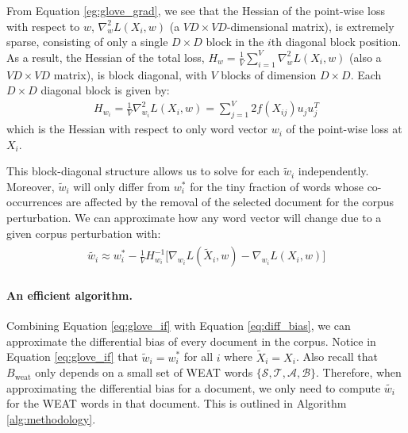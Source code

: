 \documentclass{article}
\newcommand{\xhdr}[1]{\paragraph*{\bf {#1.}}}
\begin{document}
From Equation \eqref{eg:glove_grad}, we see that the Hessian of the point-wise loss with respect to $w$, $\nabla_w^2 L(X_i, w)$ (a $VD \times VD$-dimensional matrix), is extremely sparse, consisting of only a single $D \times D$ block in the $i$th diagonal block position. As a result, the Hessian of the total loss, $H_w = \frac{1}{V}\sum_{i=1}^{V}\nabla_{w}^2 L(X_i, w)$ (also a $VD \times VD$ matrix), is block diagonal, with $V$ blocks of dimension $D \times D$. Each $D \times D$ diagonal block is given by:
\begin{align*}
H_{w_i} = \frac{1}{V} \nabla_{w_i}^2 L(X_i, w) = \sum_{j=1}^{V}2f(X_{ij})u_ju_j^T
\end{align*}
which is the Hessian with respect to only word vector $w_i$ of the point-wise loss at $X_i$.

This block-diagonal structure allows us to solve for each $\tilde{w}_i$ independently. Moreover, $\tilde{w}_i$ will only differ from $w^*_i$ for the tiny fraction of words whose co-occurrences are affected by the removal of the selected document for the corpus perturbation. We can approximate how any word vector will change due to a given corpus perturbation with:
\begin{align}\label{eq:glove_if}
\begin{split}
\tilde{w_i} \approx w^*_i - \frac{1}{V} H_{w_i}^{-1}\big[\nabla_{w_i} L(\tilde{X}_i, w) - \nabla_{w_i}L(X_i, w)\big]
\end{split}
\end{align}
\xhdr{An efficient algorithm} Combining Equation \eqref{eq:glove_if} with Equation \eqref{eq:diff_bias}, we can approximate the differential bias of every document in the corpus.
Notice in Equation \eqref{eq:glove_if} that $\tilde{w}_i = w_i^*$ for all $i$ where $\tilde{X}_i = X_i$.
Also recall that $B_{\text{weat}}$ only depends on a small set of WEAT words $\{\mathcal{S}, \mathcal{T}, \mathcal{A}, \mathcal{B}\}$.
Therefore, when approximating the differential bias for a document, we only need to compute $\tilde{w_i}$ for the WEAT words in that document. 
This is outlined in Algorithm \ref{alg:methodology}.
\end{document}
